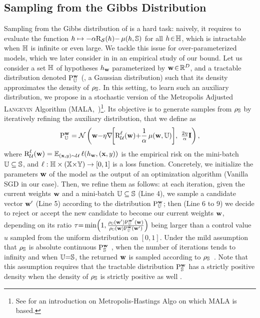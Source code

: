 \subsection{Sampling from the Gibbs Distribution}
\label{chap:dis-mu:sec:sampling}
Sampling from the Gibbs distribution of  is a hard task:
naively, it requires to evaluate the function $h\mapsto -\alpha\text{R}_{\mathcal{S}}(h){-}\operatorname{\mu}(h, \mathbb{S})$ for all $h\!\in\!\mathbb{H}$, which is intractable when $\mathbb{H}$ is infinite or even large.
We tackle this issue for over-parameterized models, which we later consider in  in an empirical study of our bound.
Let us consider a set $\mathbb{H}$ of hypotheses $h_{\mathbf{w}}$ parameterized by $\mathbf{w}\!\in\!\mathbb{R}^D$, and a tractable distribution denoted $\mathrm{P}_{\mathbb{U}}^{\mathbf{w}}$ (\eg, a Gaussian distribution) such that its density approximates the density of $\rho_{\mathbb{S}}$.
In this setting, to learn such an auxiliary distribution, we propose in  a stochastic version of the Metropolis Adjusted \textsc{Langevin} Algorithm (MALA,~\citet{Besag1994})\footnote{See \citet{ChibGreenberg1995} for an introduction on  Metropolis-Hastings Algo on which MALA is based.}.
Its objective is to generate samples from $\rho_{\mathbb{S}}$ by iteratively refining the auxiliary distribution, that we define as
\begin{align}
    \mathrm{P}_{\mathbb{U}}^{\mathbf{w}} = \mathcal{N}\left(\mathbf{w}{-}\eta\nabla\!\!\left[ \text{R}^{\ell}_{\mathcal{U}}(\mathbf{w}){+}\frac{1}{\alpha}\operatorname{\mu}(\mathbf{w}, \mathbb{U})\right]\!,\  \tfrac{2\eta}{\alpha}\mathbf{I}\right),
    \label{chap:dis-mu:eq:tractable}
\end{align}
where $\text{R}^{\ell}_{\mathcal{U}}(\mathbf{w})=\operatorname*{\mathbb{E}}_{(\mathbf{x},y)\sim\mathcal{U}}\ell(h_{\mathbf{w}}, (\mathbf{x},y))$ is the empirical risk on the mini-batch $\mathbb{U}\subseteq\mathbb{S}$, and $\ell:\mathbb{H}\times(\mathbb{X}{\times}\mathbb{Y}) \to [0,1]$ is a loss function.
Concretely, we initialize the parameters $\mathbf{w}$ of the model as the output of an optimization algorithm (Vanilla SGD in our case).
Then, we refine them as follows: 
at each iteration, given the current weights $\mathbf{w}$ and a mini-batch $\mathbb{U}\subseteq\mathbb{S}$ (Line 4), we sample a candidate vector $\mathbf{w}'$ (Line 5) according to the distribution $\mathrm{P}_{\mathbb{U}}^{\mathbf{w}}$;   
then (Line 6 to 9) we decide to reject or accept the new candidate to become our current weights $\mathbf{w}$, depending on its ratio $\tau {=} \min\!\Big(1, \frac{\rho_{\mathbb{U}}(\mathbf{w}')\mathrm{P}_{\mathbb{U}}^{\mathbf{w}'}(\mathbf{w})}{\rho_{\mathbb{U}}(\mathbf{w})\mathrm{P}_{\mathbb{U}}^{\mathbf{w}}(\mathbf{w}')}\Big)$ being larger than a control value $u$ sampled from the uniform distribution on $[0,1]$. 
Under the mild assumption that $\rho_{\mathbb{S}}$ is absolute continuous \wrt $\mathrm{P}_{\mathbb{S}}^{\mathbf{w}}$ \citep[see][for details]{ChibGreenberg1995}, when the number of iterations tends to infinity and when $\mathbb{U}{=}\mathbb{S}$, the returned $\mathbf{w}$ is sampled according to $\rho_{\mathbb{S}}$~\citep{SmithRoberts1993}.
Note that this assumption requires that the tractable distribution $\mathrm{P}_{\mathbb{S}}^{\mathbf{w}}$ has a strictly positive density when the density of $\rho_{\mathbb{S}}$ is strictly positive as well \citep[see][]{ChibGreenberg1995}. 

